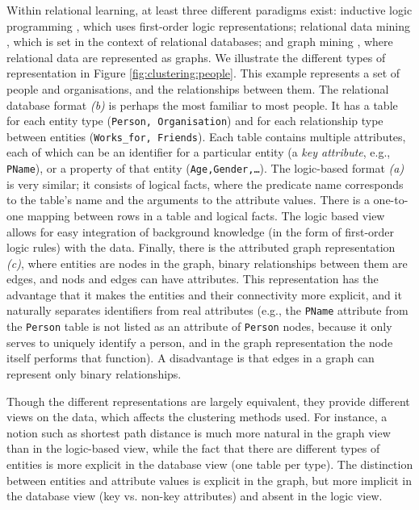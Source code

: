 Within relational learning, at least three different paradigms exist: inductive logic programming \cite{MuggletonR94}, which uses first-order logic representations; relational data mining \cite{DzeroskiB04}, which is set in the context of relational databases; and graph mining \cite{Cook2006}, where relational data are represented as graphs.
We illustrate the different types of representation in Figure \ref{fig:clustering:people}.
This example represents a set of people and organisations, and the relationships between them.
The relational database format \textit{(b)} is perhaps the most familiar to most people.
It has a table for each entity type (\texttt{Person, Organisation}) and for each relationship type between entities (\texttt{Works\_for, Friends}).
Each table contains multiple attributes, each of which can be an identifier for a particular entity (a \textit{key attribute}, e.g., \texttt{PName}), or a property of that entity (\texttt{Age,Gender,\ldots}).
The logic-based format \textit{(a)} is very similar; it consists of logical facts, where the predicate name corresponds to the table’s name and the arguments to the attribute values.
There is a one-to-one mapping between rows in a table and logical facts.
The logic based view allows for easy integration of background knowledge (in the form of first-order logic rules) with the data.
Finally, there is the attributed graph representation \textit{(c)}, where entities are nodes in the graph, binary relationships between them are edges, and nods and edges can have attributes.
This representation has the advantage that it makes the entities and their connectivity more explicit, and it naturally separates identifiers from real attributes (e.g., the \texttt{PName} attribute from the \texttt{Person} table is not listed as an attribute of \texttt{Person} nodes, because it only serves to uniquely identify a person, and in the graph representation the node itself performs that function).
A disadvantage is that edges in a graph can represent only binary relationships.


Though the different representations are largely equivalent, they provide different views on the data, which affects the clustering methods used.
For instance, a notion such as shortest path distance is much more natural in the graph view than in the logic-based view, while the fact that there are  different types of entities is more explicit in the database view (one table per type).
The distinction between entities and attribute values is explicit in the graph, but more implicit in the database view (key vs. non-key attributes) and absent in the logic view.


